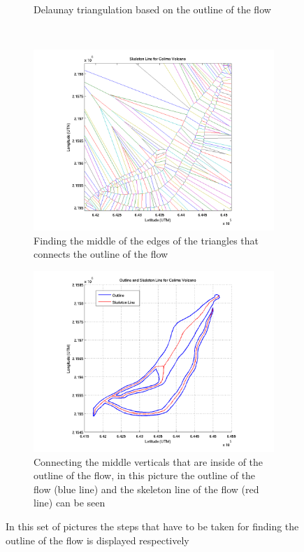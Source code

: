 \documentclass[letterpaper,10pt]{article}
\begin{document}
\begin{figure}
\begin{subfigure}[b]{0.45\textwidth}
                \caption{Delaunay triangulation based on the outline of the flow}
                \label{fig:Delaunay}
        \end{subfigure}\\
        \begin{subfigure}[b]{0.45\textwidth}
                \includegraphics[width=\textwidth]{IMAGES/pics/Skeleton_line.png}
                \caption{Finding the middle of the edges of the triangles that connects the outline of the flow}
                \label{fig:veroni}
        \end{subfigure}
        \begin{subfigure}[b]{0.45\textwidth}
                \includegraphics[width=\textwidth]{IMAGES/pics/Outline_Skeleton_line.png}
                \caption{Connecting the middle verticals that are inside of the outline of the flow, in this picture the
                outline of the flow (blue line) and the skeleton line of the flow (red line) can be seen}
                \label{fig:skeleton}
        \end{subfigure}
                
        \caption{In this set of pictures the steps that have to be taken for finding the outline of the flow is displayed 
        respectively}\label{fig:skeleton_line_proc}
\end{figure}
\end{document}
